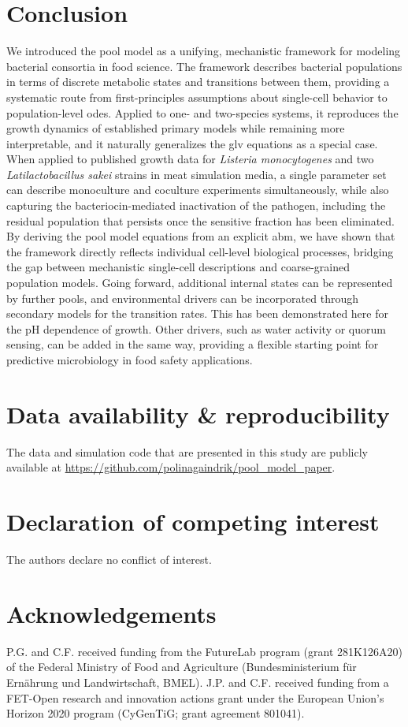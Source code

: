 \documentclass[10pt,1p,authoryear]{elsarticle}
\numberwithin{equation}{section}
\begin{document}
\section{Conclusion}
%
We introduced the pool model as a unifying, mechanistic framework for modeling
bacterial consortia in food science.
The framework describes bacterial populations in terms of discrete metabolic states
and transitions between them, providing a systematic route from first-principles
assumptions about single-cell behavior to population-level \acp{ode}.
Applied to one- and two-species systems, it reproduces the growth dynamics of
established primary models while remaining more interpretable, and it naturally
generalizes the \ac{glv} equations as a special case.\\
When applied to published growth data for \textit{Listeria monocytogenes} and two \textit{Latilactobacillus sakei} strains in meat simulation media, a single parameter set can describe monoculture and coculture experiments simultaneously, while also capturing the bacteriocin-mediated inactivation of the pathogen, including the residual population that persists once the sensitive fraction has been eliminated.\\
%
By deriving the pool model equations from an explicit \ac{abm}, we have shown that the
framework directly reflects individual cell-level biological processes, bridging the
gap between mechanistic single-cell descriptions and coarse-grained population models.
Going forward, additional internal states can be represented by further pools, and
environmental drivers can be incorporated through secondary models for the transition rates.
This has been demonstrated here for the pH dependence of growth. Other drivers, such as
water activity or quorum sensing, can be added in the same way, providing a flexible
starting point for predictive microbiology in food safety applications.
%
\newpage
\section*{Data availability \& reproducibility}
The data and simulation code that are presented in this study are publicly available at
\url{https://github.com/polinagaindrik/pool_model_paper}.
%
\section*{Declaration of competing interest}
The authors declare no conflict of interest.
%
\section*{Acknowledgements}
P.G. and C.F. received funding from the FutureLab program (grant 281K126A20) of the Federal Ministry of Food and Agriculture (Bundesministerium für Ernährung und Landwirtschaft, BMEL). J.P. and C.F. received funding from a FET-Open research and innovation actions grant under the European Union's Horizon 2020 program (CyGenTiG; grant agreement 801041).
%
\end{document}
